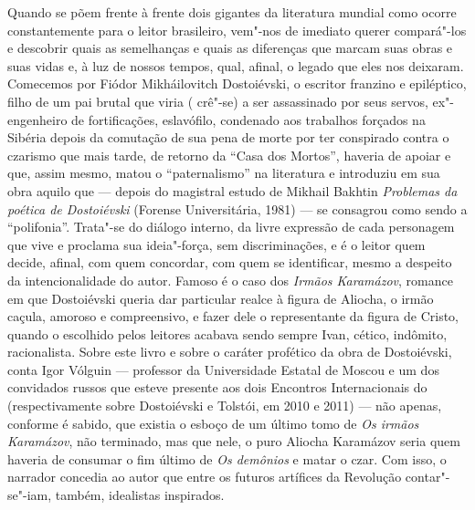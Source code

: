 Quando se põem frente à frente dois gigantes da literatura mundial como
ocorre constantemente para o leitor brasileiro, 
vem"-nos de imediato querer compará"-los e
descobrir quais as semelhanças e quais as diferenças que marcam suas
obras e suas vidas e, à luz de nossos tempos, qual, afinal, o legado que
eles nos deixaram. Comecemos por Fiódor Mikháilovitch Dostoiévski, o
escritor franzino e epiléptico, filho de um pai brutal que viria (
crê"-se) a ser assassinado por seus servos, ex"-engenheiro de
fortificações, eslavófilo, condenado aos trabalhos forçados na Sibéria
depois da comutação de sua pena de morte por ter conspirado contra o
czarismo que mais tarde, de retorno da ``Casa dos Mortos'', haveria de
apoiar e que, assim mesmo, matou o ``paternalismo'' na literatura e
introduziu em sua obra aquilo que --- depois do magistral estudo de
Mikhail Bakhtin \emph{Problemas da poética de Dostoiévski} (Forense
Universitária, 1981) --- se consagrou como sendo a ``polifonia''.
Trata"-se do diálogo interno, da livre expressão de cada personagem que
vive e proclama sua ideia"-força, sem discriminações, e é o leitor quem
decide, afinal, com quem concordar, com quem se identificar, mesmo a
despeito da intencionalidade do autor. Famoso é o caso dos \emph{Irmãos
Karamázov}, romance em que Dostoiévski queria dar particular realce à
figura de Aliocha, o irmão caçula, amoroso e compreensivo, e fazer dele
o representante da figura de Cristo, quando o escolhido pelos leitores
acabava sendo sempre Ivan, cético, indômito, racionalista. Sobre este
livro e sobre o caráter profético da obra de Dostoiévski, conta Igor
Vólguin --- professor da Universidade Estatal de Moscou e um dos
convidados russos que esteve presente aos dois Encontros Internacionais do  (respectivamente sobre Dostoiévski e
Tolstói, em 2010 e 2011) --- não
apenas, conforme é sabido, que existia o esboço de um último tomo de
\emph{Os irmãos Karamázov}, não terminado, mas que nele, o puro
Aliocha Karamázov seria quem haveria de consumar o fim último de \emph{Os
demônios} e matar o czar. Com isso, o narrador concedia ao autor que
entre os futuros artífices da Revolução contar"-se"-iam, também,
idealistas inspirados.

